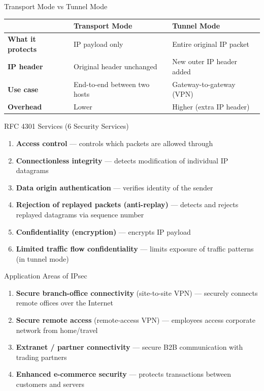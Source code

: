 \documentclass[12pt,a4paper]{article}
\begin{document}
\vspace{0.5em}

\begin{algobox}{Transport Mode vs Tunnel Mode}
\begin{tabular}{@{}p{3.5cm}p{5.5cm}p{5cm}@{}}
\toprule
 & \textbf{Transport Mode} & \textbf{Tunnel Mode} \\
\midrule
\textbf{What it protects} & IP payload only & Entire original IP packet \\
\textbf{IP header} & Original header unchanged & New outer IP header added \\
\textbf{Use case} & End-to-end between two hosts & Gateway-to-gateway (VPN) \\
\textbf{Overhead} & Lower & Higher (extra IP header) \\
\bottomrule
\end{tabular}
\end{algobox}

\vspace{0.5em}

\begin{algobox}{RFC 4301 Services (6 Security Services)}
\begin{enumerate}[nosep]
  \item \textbf{Access control} --- controls which packets are allowed through
  \item \textbf{Connectionless integrity} --- detects modification of individual IP datagrams
  \item \textbf{Data origin authentication} --- verifies identity of the sender
  \item \textbf{Rejection of replayed packets (anti-replay)} --- detects and rejects replayed datagrams via sequence number
  \item \textbf{Confidentiality (encryption)} --- encrypts IP payload
  \item \textbf{Limited traffic flow confidentiality} --- limits exposure of traffic patterns (in tunnel mode)
\end{enumerate}
\end{algobox}

\vspace{0.5em}

\begin{algobox}{Application Areas of IPsec}
\begin{enumerate}[nosep]
  \item \textbf{Secure branch-office connectivity} (site-to-site VPN) --- securely connects remote offices over the Internet
  \item \textbf{Secure remote access} (remote-access VPN) --- employees access corporate network from home/travel
  \item \textbf{Extranet / partner connectivity} --- secure B2B communication with trading partners
  \item \textbf{Enhanced e-commerce security} --- protects transactions between customers and servers
\end{enumerate}
\end{algobox}
\end{document}
